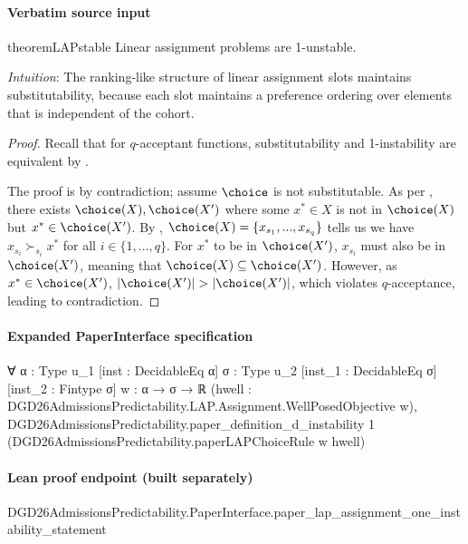 \documentclass[10pt]{article}
\begin{document}
\paragraph{Verbatim source input}
\begin{ReviewVerbatim}
\begin{restatable}{theorem}{LAPstable}
\label{thm:lap-unstable}
Linear assignment problems are 1-unstable.
\end{restatable}

\textit{Intuition}: The ranking-like structure of linear assignment slots maintains substitutability, because each slot maintains a  preference ordering over elements that is independent of the cohort.

\begin{proof}
Recall that for $q$-acceptant functions, substitutability and 1-instability are equivalent by .

The proof is by contradiction; assume $\choice$ is not substitutable. As per , there exists $\choice(X), \choice(X')$ where some $x^* \in X$ is not in $\choice(X)$ but $x^* \in \choice(X')$.
By , $\choice(X) = \{x_{s_1}, ..., x_{s_q}\}$ tells us we have $x_{s_i} \succ_{s_i} x^*$ for all $i \in \{1, ..., q\}$. For $x^*$ to be in $\choice(X')$, $x_{s_i}$ must also be in $\choice(X')$, meaning that $\choice(X) \subseteq \choice(X')$. However, as $x^* \in \choice(X')$, $|\choice(X')| > |\choice(X')|$, which violates $q$-acceptance, leading to contradiction.
\end{proof}
\end{ReviewVerbatim}


\paragraph{Expanded PaperInterface specification}
\begin{ReviewVerbatim}
∀ {α : Type u_1} [inst : DecidableEq α] {σ : Type u_2} [inst_1 : DecidableEq σ] [inst_2 : Fintype σ] {w : α → σ → ℝ}
  (hwell : DGD26AdmissionsPredictability.LAP.Assignment.WellPosedObjective w),
  DGD26AdmissionsPredictability.paper_definition_d_instability 1
    (DGD26AdmissionsPredictability.paperLAPChoiceRule w hwell)
\end{ReviewVerbatim}

\paragraph{Lean proof endpoint (built separately)}\begin{ReviewVerbatim}
DGD26AdmissionsPredictability.PaperInterface.paper_lap_assignment_one_instability_statement
\end{ReviewVerbatim}
\end{document}
